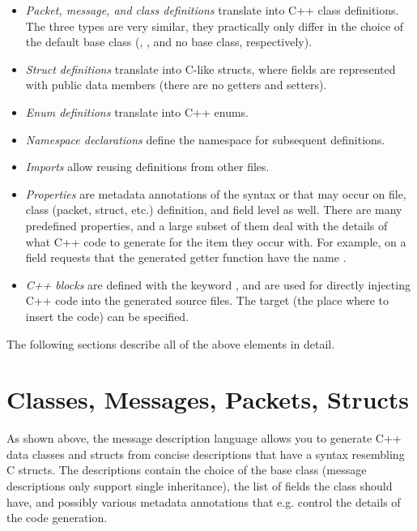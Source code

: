 \begin{itemize}
  \item \textit{Packet, message, and class definitions} translate into C++ class
    definitions. The three types are very similar, they practically only differ
    in the choice of the default base class (,
    , and no base class, respectively).
  \item \textit{Struct definitions} translate into C-like structs, where fields
    are represented with public data members (there are no getters and setters).
  \item \textit{Enum definitions} translate into C++ enums.
  \item \textit{Namespace declarations} define the namespace for subsequent definitions.
  \item \textit{Imports} allow reusing definitions from other  files.
  \item \textit{Properties} are metadata annotations of the syntax 
    or  that may occur on file, class (packet, struct, etc.)
    definition, and field level as well. There are many predefined properties,
    and a large subset of them deal with the details of what C++ code to
    generate for the item they occur with. For example, 
    on a field requests that the generated getter function have the name .
  \item \textit{C++ blocks} are defined with the keyword , and
    are used for directly injecting C++ code into the generated source files.
    The target (the place where to insert the code) can be specified.
\end{itemize}

The following sections describe all of the above elements in detail.


\section{Classes, Messages, Packets, Structs}
\label{sec:msg-defs:classes-messages-packets-structs}

As shown above, the message description language allows you to generate C++ data
classes and structs from concise descriptions that have a syntax resembling C
structs. The descriptions contain the choice of the base class (message
descriptions only support single inheritance), the list of fields the class
should have, and possibly various metadata annotations that e.g. control the
details of the code generation.

